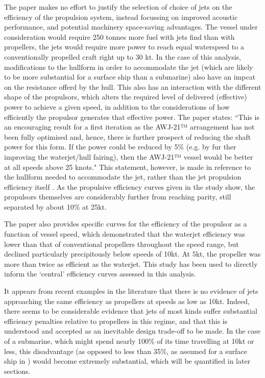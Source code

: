 \documentclass{article}\usepackage[]{graphicx}\usepackage[]{color}
\begin{document}
The paper makes no effort to justify the selection of choice of jets on the efficiency of the propulsion system, instead focussing on improved acoustic performance, and potential machinery space-saving advantages.  The vessel under consideration would require 250 tonnes more fuel with jets find than with propellers, the jets would require more power to reach equal waterspeed to a conventionally propelled craft right up to 30 kt.  In the case of this analysis, modifications to the hullform in order to accommodate the jet (which are likely to be more substantial for a surface ship than a submarine) also have an impcat on the resistance offerd by the hull.  This also has an interaction with the different shape of the propulsors, which alters the required level of delivered (effective) power to achieve a given speed, in addition to the considerations of how efficiently the propulsor generates that effective power. The paper states: ``This is an encouraging result for a first iteration as the AWJ-21™ arrangement has not been fully optimised and, hence, there is further prospect of reducing the shaft power for this form. If the power could be reduced by 5\% (e.g. by fur ther improving the waterjet/hull fairing), then the AWJ-21™ vessel would be better at all speeds above 25 knots."  This statement, however, is made in reference to the hullform needed to accommodate the jet, rather than the jet propulsion efficiency itself \parencite{giles2010}.  As the propulsive efficiency curves given in the study show, the propulsors themselves are considerably further from reaching parity, still separated by about 10\% at 25kt.

The paper also provides specific curves for the efficiency of the propulsor as a function of vessel speed, which demonstrated that the waterjet efficiency was lower than that of conventional propellers throughout the speed range, but declined particularly precipitously below speeds of 10kt.  At 5kt, the propeller was more than twice as efficient as the waterjet.  This study has been used to directly inform the `central' efficiency curves assessed in this analysis.

It appears from recent examples in the literature that there is no evidence of jets approaching the same efficiency as propellers at speeds as low as 10kt.  Indeed, there seems to be considerable evidence that jets of most kinds suffer substantial efficiency penalties relative to propellers in this regime, and that this is understood and accepted as an inevitable design trade-off to be made.  In the case of a submarine, which might spend nearly 100\% of its time travelling at 10kt or less, this disadvantage (as opposed to less than 35\%, as assumed for a surface ship in \cite{giles2010}) would become extremely substantial, which will be quantified in later sections.
\end{document}
